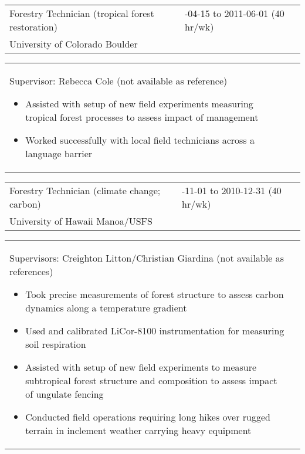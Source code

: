\documentclass[10pt,english]{article}
\providecommand{\tabularnewline}{\\}
\begin{document}
\newpage

\renewcommand{\arraystretch}{1.2}
\begin{tabularx}{\textwidth}{@{}>{\raggedright}p{3.75in} >{\raggedleft}X@{}}
Forestry Technician (tropical forest restoration) & 2011-04-15 to 2011-06-01 (40 hr/wk) \tabularnewline
University of Colorado Boulder & \tabularnewline
\end{tabularx}

\renewcommand{\arraystretch}{1.2}
\begin{tabularx}{\textwidth}{@{}>{\raggedright}p{6.25in} >{\raggedleft}X@{}}
\addtolength{\leftskip}{5ex}Supervisor: Rebecca Cole (not available as reference)
\begin{itemize}
\itemsep0em
\item{Assisted with setup of new field experiments measuring tropical forest processes to assess impact of management}
\item{Worked successfully with local field technicians across a language barrier}
\end{itemize}
\end{tabularx}

\renewcommand{\arraystretch}{1.2}
\begin{tabularx}{\textwidth}{@{}>{\raggedright}p{3.75in} >{\raggedleft}X@{}}
Forestry Technician (climate change; carbon) & 2009-11-01 to 2010-12-31 (40 hr/wk) \tabularnewline
University of Hawaii Manoa/USFS & \tabularnewline
\end{tabularx}

\renewcommand{\arraystretch}{1.2}
\begin{tabularx}{\textwidth}{@{}>{\raggedright}p{6.25in} >{\raggedleft}X@{}}
\addtolength{\leftskip}{5ex}Supervisors: Creighton Litton/Christian Giardina (not available as references)
\begin{itemize}
\itemsep0em
\item{Took precise measurements of forest structure to assess carbon dynamics along a temperature gradient}
\item{Used and calibrated LiCor-8100 instrumentation for measuring soil respiration}
\item{Assisted with setup of new field experiments to measure subtropical forest structure and composition to assess impact of ungulate fencing}
\item{Conducted field operations requiring long hikes over rugged terrain in inclement weather carrying heavy equipment}
\end{itemize}
\end{tabularx}
\end{document}
